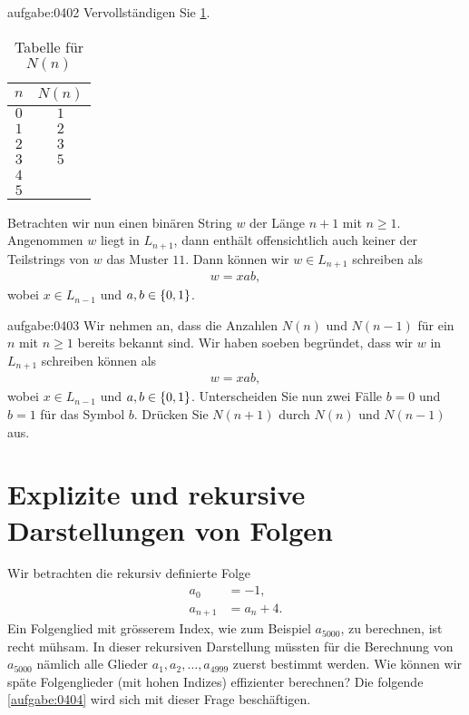 \begin{aufgabe}{aufgabe:0402}
Vervollständigen Sie \cref{table:Nn}.
    \begin{table}[H]
        \begin{center}
        \begin{tabular}{c|c}
        $n$ & $N(n)$ \\ \hline
        $0$ & $1$ \\
        $1$ & $2$ \\ 
        $2$ & $3$ \\
        $3$ & $5$ \\
        $4$ & \\
        $5$ & \\ 
        \end{tabular}
        \end{center}
        \caption{Tabelle für $N(n)$}
        \label{table:Nn}
    \end{table}
\end{aufgabe}
\noindent
Betrachten wir nun einen binären String $w$ der Länge $n+1$ mit $n\geq 1$. Angenommen $w$ liegt in $L_{n+1}$, dann enthält offensichtlich auch keiner der Teilstrings von $w$ das Muster $11$. Dann können wir $w\in L_{n+1}$ schreiben als
\begin{align*}
    w = xab,
\end{align*}
wobei $x\in L_{n-1}$ und $a,b\in\left\{0,1\right\}$.

\begin{aufgabe}{aufgabe:0403}
Wir nehmen an, dass die Anzahlen $N(n)$ und $N(n-1)$ für ein $n$ mit $n\geq 1$ bereits bekannt sind. Wir haben soeben begründet, dass wir $w$ in $L_{n+1}$ schreiben können als
\begin{align*}
    w = xab,
\end{align*}
wobei $x\in L_{n-1}$ und $a,b\in\left\{0,1\right\}$. Unterscheiden Sie nun zwei Fälle $b = 0$ und $b = 1$ für das Symbol $b$. Drücken Sie $N(n+1)$ durch $N(n)$ und $N(n-1)$ aus.
\end{aufgabe}

\section{Explizite und rekursive Darstellungen von Folgen}
Wir betrachten die rekursiv definierte Folge
\begin{align*}
    a_0 &= -1, \\
    a_{n+1} &= a_n + 4.
\end{align*}
Ein Folgenglied mit grösserem Index, wie zum Beispiel $a_{5000}$, zu berechnen, ist recht mühsam. In dieser rekursiven Darstellung müssten für die Berechnung von 
$a_{5000}$ nämlich alle Glieder $a_{1}, a_{2}, \ldots, a_{4999}$ zuerst bestimmt werden. Wie können wir späte Folgenglieder (mit hohen Indizes) effizienter berechnen? Die folgende \cref{aufgabe:0404} wird sich mit dieser Frage beschäftigen.

